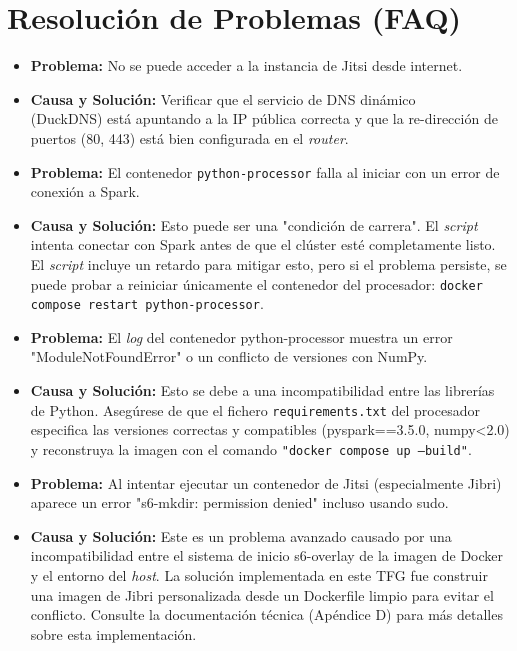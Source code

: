 \section{Resolución de Problemas (FAQ)}
\label{sec:manual_faq}
\begin{itemize}

    \item \textbf{Problema:} No se puede acceder a la instancia de Jitsi desde internet.
    \item \textbf{Causa y Solución:} Verificar que el servicio de DNS dinámico \\ (DuckDNS) está apuntando a la IP pública correcta y que la re-dirección de puertos (80, 443) está bien configurada en el \textit{router}.

    \item \textbf{Problema:} El contenedor \texttt{python-processor} falla al iniciar con un error de conexión a Spark.
    \item \textbf{Causa y Solución:} Esto puede ser una "condición de carrera". El \textit{script} intenta conectar con Spark antes de que el clúster esté completamente listo. El \textit{script} incluye un retardo para mitigar esto, pero si el problema persiste, se puede probar a reiniciar únicamente el contenedor del procesador: \texttt{docker compose restart python-processor}.

    \item \textbf{Problema:} El \textit{log} del contenedor python-processor muestra un error "ModuleNotFoundError" o un conflicto de versiones con NumPy.
    \item \textbf{Causa y Solución:} Esto se debe a una incompatibilidad entre las librerías de Python. Asegúrese de que el fichero \texttt{requirements.txt} del procesador especifica las versiones correctas y compatibles (pyspark==3.5.0, numpy<2.0) y reconstruya la imagen con el comando \texttt{"docker compose up --build"}.

    \item \textbf{Problema:} Al intentar ejecutar un contenedor de Jitsi (especialmente Jibri) aparece un error "s6-mkdir: permission denied" incluso usando sudo.
    \item \textbf{Causa y Solución:} Este es un problema avanzado causado por una incompatibilidad entre el sistema de inicio s6-overlay de la imagen de Docker y el entorno del \textit{host}. La solución implementada en este TFG fue construir una imagen de Jibri personalizada desde un Dockerfile limpio para evitar el conflicto. Consulte la documentación técnica (Apéndice D) para más detalles sobre esta implementación.
    
\end{itemize}